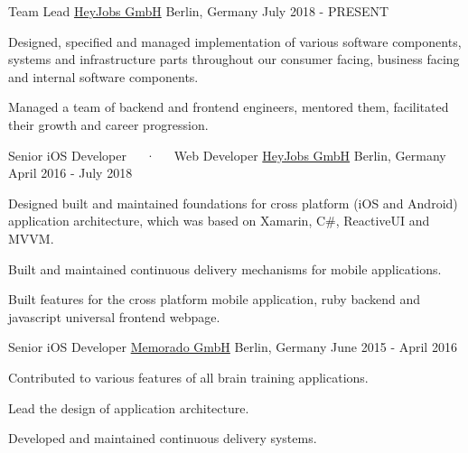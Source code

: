 

\begin{cventries}

  \cventry
    {Team Lead} %
    {\href{https://heyjobs.co}{HeyJobs GmbH}} %
    {Berlin, Germany} %
    {July 2018 - PRESENT} %
    {
      \begin{cvitems} %
        \item {Designed, specified and managed implementation of various software components, systems and infrastructure parts throughout our consumer facing, business facing and internal software components.}
        \item {Managed a team of backend and frontend engineers, mentored them, facilitated their growth and career progression.}
      \end{cvitems}
    }

  \cventry
    {Senior iOS Developer~~~·~~~Web Developer} %
    {\href{https://heyjobs.co}{HeyJobs GmbH}} %
    {Berlin, Germany} %
    {April 2016 - July 2018} %
    {
      \begin{cvitems} %
        \item {Designed built and maintained foundations for cross platform (iOS and Android) application architecture, which was based on Xamarin, C\#, ReactiveUI and MVVM.}
        \item {Built and maintained continuous delivery mechanisms for mobile applications.}
        \item {Built features for the cross platform mobile application, ruby backend and javascript universal frontend webpage.}
      \end{cvitems}
    }

  \cventry
    {Senior iOS Developer} %
    {\href{https://memorado.com}{Memorado GmbH}} %
    {Berlin, Germany} %
    {June 2015 - April 2016} %
    {
      \begin{cvitems} %
        \item {Contributed to various features of all brain training applications.}
        \item {Lead the design of application architecture.}
        \item {Developed and maintained continuous delivery systems.}
      \end{cvitems}
    }


\end{cventries}
